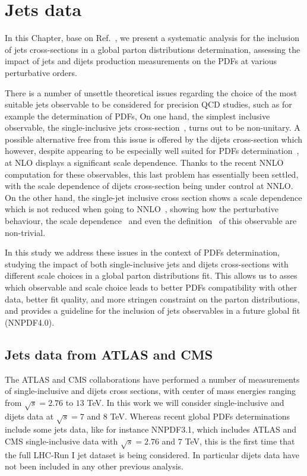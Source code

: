 \chapter{Jets data}
\label{ch:jets}
In this Chapter, base on Ref.~\cite{AbdulKhalek:2020jut}, we present a systematic analysis for the inclusion 
of jets cross-sections in a global parton distributions determination,
assessing the impact of jets and dijets production measurements on the PDFs at various perturbative orders.

% 
There is a number of unsettle theoretical issues regarding the choice of the most suitable jets observable
to be considered for precision QCD studies, such as for example the determination of PDFs,
On one hand, the simplest inclusive observable, 
the single-inclusive jets cross-section~\cite{Ellis:1990ek,Aversa:1988fv}, turns out to be non-unitary.
A possible alternative free from this issue is offered by the dijets cross-section which however, despite appearing to be 
especially well suited for PDFs determination~\cite{Giele:1994xd}, at NLO displays a significant scale dependence. 
Thanks to the recent NNLO computation for these observables, this last problem has essentially been settled,
with the scale dependence of dijets cross-section being under control at NNLO.
On the other hand, the single-jet inclusive cross section
shows a scale dependence which is not reduced when going to NNLO~\cite{Currie:2017ctp}, 
showing how the perturbative behaviour, the scale dependence~\cite{Currie:2018xkj} and even the definition~\cite{Cacciari:2019qjx} 
of this observable are non-trivial.  

%
In this study we address these issues in the context of PDFs determination, studying the impact of both single-inclusive
jets and dijets cross-sections with different scale choices in a global parton distributions fit. 
This allows us to asses which observable and scale choice leads to better PDFs compatibility with other data, better fit quality,
and more stringen constraint on the parton distributions, and provides a guideline for the inclusion of jets observables in a future
global fit (NNPDF4.0).

\section{Jets data from ATLAS and CMS}
\label{sec:jets_data}
The ATLAS and CMS collaborations have performed a number of measurements of single-inclusive and 
dijets cross sections, with center of mass energies ranging from $\sqrt{s}=2.76$ to $13$ TeV.
In this work we will consider single-inclusive and dijets data at $\sqrt{s}=7$ and $8$ TeV.
%
Whereas recent global PDFs determinations include some jets data, like for instance NNPDF3.1, which includes ATLAS and CMS 
single-inclusive data with $\sqrt{s}=2.76$ and $7$ TeV, this is the first time that the full LHC-Run I jet dataset is being 
considered. In particular dijets data have not been included in any other previous analysis.

